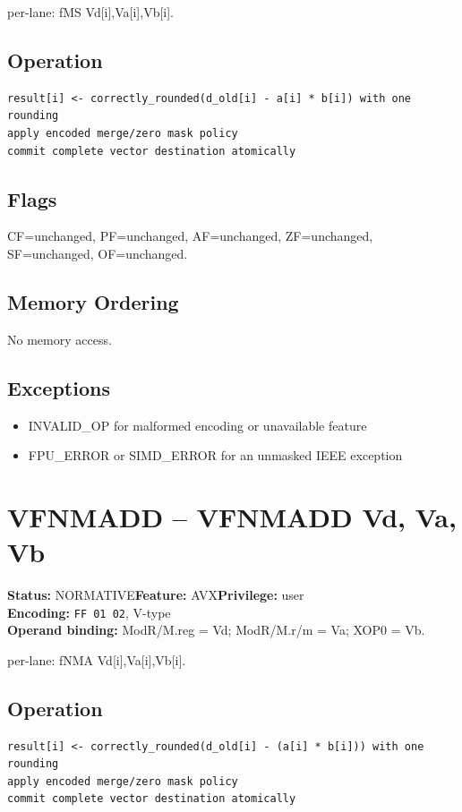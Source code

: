 \documentclass[10pt]{article}
\begin{document}
per-lane: fMS Vd[i],Va[i],Vb[i].

\subsection*{Operation}
\begin{lstlisting}
result[i] <- correctly_rounded(d_old[i] - a[i] * b[i]) with one rounding
apply encoded merge/zero mask policy
commit complete vector destination atomically
\end{lstlisting}
\subsection*{Flags}
CF=unchanged, PF=unchanged, AF=unchanged, ZF=unchanged, SF=unchanged, OF=unchanged.
\subsection*{Memory Ordering}
No memory access.
\subsection*{Exceptions}
\begin{itemize}
\item INVALID\_OP for malformed encoding or unavailable feature
\item FPU\_ERROR or SIMD\_ERROR for an unmasked IEEE exception
\end{itemize}
\clearpage

\section{VFNMADD -- VFNMADD Vd, Va, Vb}
\textbf{Status:} NORMATIVE\quad \textbf{Feature:} AVX\quad \textbf{Privilege:} user\\
\textbf{Encoding:} \texttt{FF 01 02}, V-type\\
\textbf{Operand binding:} ModR/M.reg = Vd; ModR/M.r/m = Va; XOP0 = Vb.

per-lane: fNMA Vd[i],Va[i],Vb[i].

\subsection*{Operation}
\begin{lstlisting}
result[i] <- correctly_rounded(d_old[i] - (a[i] * b[i])) with one rounding
apply encoded merge/zero mask policy
commit complete vector destination atomically
\end{lstlisting}
\end{document}
